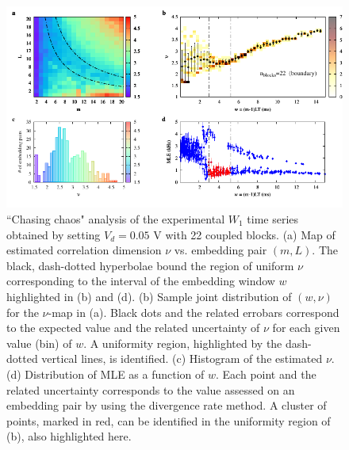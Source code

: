 \begin{figure}[H]
    \centering
    \includegraphics[width=\linewidth]{../blocks/22_blocks/2e5_points/plots/chaos_low.pdf}
    \caption{``Chasing chaos" analysis of the experimental $W_1$ time series obtained by setting $V_d=0.05$ V with 22 coupled blocks.
    (a) Map of estimated correlation dimension $\nu$ vs. embedding pair $(m, L)$.
    The black, dash-dotted hyperbolae bound the region of uniform $\nu$ corresponding to the interval of the
    embedding window $w$ highlighted in (b) and (d).
    (b) Sample joint distribution of $(w,\nu)$ for the $\nu$-map in (a).
    Black dots and the related errobars correspond to the expected value and the related uncertainty of $\nu$
    for each given value (bin) of $w$. A uniformity region, highlighted by the dash-dotted vertical lines,
    is identified. (c) Histogram of the estimated $\nu$. (d) Distribution of MLE as a function of $w$. Each point and the related
    uncertainty corresponds to the value assessed on an embedding pair by using the divergence rate method.
    A cluster of points, marked in red, can be identified in the uniformity region of (b), also highlighted here.}
    \label{fig:22 blocks chaos}
\end{figure}


